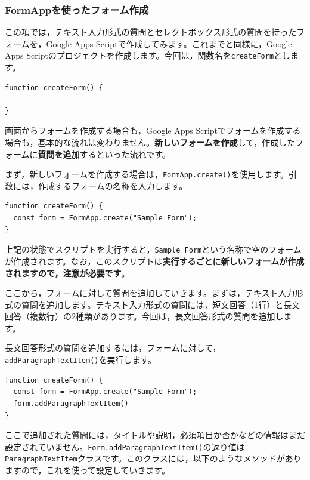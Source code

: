 \documentclass[uplatex,a4j]{jsarticle}
\begin{document}
\subsubsection{FormAppを使ったフォーム作成}

この項では，テキスト入力形式の質問とセレクトボックス形式の質問を持ったフォームを，Google Apps Scriptで作成してみます。これまでと同様に，Google Apps Scriptのプロジェクトを作成します。今回は，関数名を\verb|createForm|とします。

\begin{lstlisting}[basicstyle=\ttfamily\footnotesize,frame=single,caption=FormApp sample 1]
function createForm() {

}
\end{lstlisting}

画面からフォームを作成する場合も，Google Apps Scriptでフォームを作成する場合も，基本的な流れは変わりません。\textbf{新しいフォームを作成}して，作成したフォームに\textbf{質問を追加}するといった流れです。

まず，新しいフォームを作成する場合は，\verb|FormApp.create()|を使用します。引数には，作成するフォームの名称を入力します。

\begin{lstlisting}[basicstyle=\ttfamily\footnotesize,frame=single,caption=FormApp sample 2]
function createForm() {
  const form = FormApp.create("Sample Form");
}
\end{lstlisting}

上記の状態でスクリプトを実行すると，\verb|Sample Form|という名称で空のフォームが作成されます。なお，このスクリプトは\textbf{実行するごとに新しいフォームが作成されますので，注意が必要です}。

ここから，フォームに対して質問を追加していきます。まずは，テキスト入力形式の質問を追加します。テキスト入力形式の質問には，短文回答（1行）と長文回答（複数行）の2種類があります。今回は，長文回答形式の質問を追加します。

長文回答形式の質問を追加するには，フォームに対して，\verb|addParagraphTextItem()|を実行します。

\begin{lstlisting}[basicstyle=\ttfamily\footnotesize,frame=single,caption=FormApp sample 3]
function createForm() {
  const form = FormApp.create("Sample Form");
  form.addParagraphTextItem()
}
\end{lstlisting}

ここで追加された質問には，タイトルや説明，必須項目か否かなどの情報はまだ設定されていません。\verb|Form.addParagraphTextItem()|の返り値は\verb|ParagraphTextItem|クラスです。このクラスには，以下のようなメソッドがありますので，これを使って設定していきます。
\end{document}
